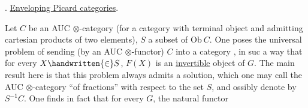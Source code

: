  . \uline{Enveloping Picard categories}.

Let $C$ be an  AUC $\otimes$-category (for  a category with terminal object and admitting cartesian products of two elements), $S$ a subset of $\mathrm{Ob}\ C$. One poses the universal problem of sending (by an AUC $\otimes$-functor) $C$ into a \inserted{$\otimes$-}category , in suc a way that for every $X\handwritten{\in} S$, $F(X)$ is an \uline{invertible} object of $G$. The main result here is that this problem always admits a solution, which one may call the AUC $\otimes$-category ``of fractions'' with respect to the set $S$, and ossibly denote by $S^{-1}C$. One finds in fact that for every $G$, the natural functor
